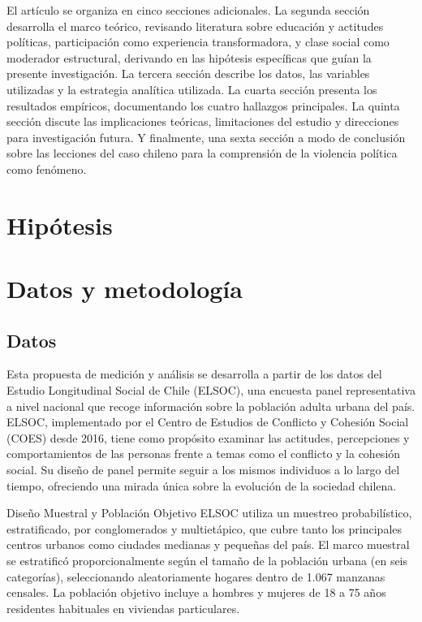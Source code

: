 \documentclass[
  12pt,
]{article}
\begin{document}
El artículo se organiza en cinco secciones adicionales. La segunda
sección desarrolla el marco teórico, revisando literatura sobre
educación y actitudes políticas, participación como experiencia
transformadora, y clase social como moderador estructural, derivando en
las hipótesis específicas que guían la presente investigación. La
tercera sección describe los datos, las variables utilizadas y la
estrategia analítica utilizada. La cuarta sección presenta los
resultados empíricos, documentando los cuatro hallazgos principales. La
quinta sección discute las implicaciones teóricas, limitaciones del
estudio y direcciones para investigación futura. Y finalmente, una sexta
sección a modo de conclusión sobre las lecciones del caso chileno para
la comprensión de la violencia política como fenómeno.

\section{Hipótesis}\label{hipuxf3tesis}

\section{Datos y metodología}\label{datos-y-metodologuxeda}

\subsection{Datos}\label{datos}

Esta propuesta de medición y análisis se desarrolla a partir de los
datos del Estudio Longitudinal Social de Chile (ELSOC), una encuesta
panel representativa a nivel nacional que recoge información sobre la
población adulta urbana del país. ELSOC, implementado por el Centro de
Estudios de Conflicto y Cohesión Social (COES) desde 2016, tiene como
propósito examinar las actitudes, percepciones y comportamientos de las
personas frente a temas como el conflicto y la cohesión social. Su
diseño de panel permite seguir a los mismos individuos a lo largo del
tiempo, ofreciendo una mirada única sobre la evolución de la sociedad
chilena.

Diseño Muestral y Población Objetivo ELSOC utiliza un muestreo
probabilístico, estratificado, por conglomerados y multietápico, que
cubre tanto los principales centros urbanos como ciudades medianas y
pequeñas del país. El marco muestral se estratificó proporcionalmente
según el tamaño de la población urbana (en seis categorías),
seleccionando aleatoriamente hogares dentro de 1.067 manzanas censales.
La población objetivo incluye a hombres y mujeres de 18 a 75 años
residentes habituales en viviendas particulares.
\end{document}
